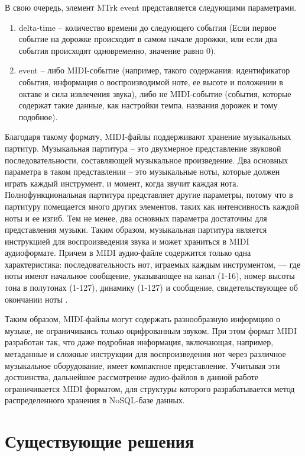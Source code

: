 В свою очередь, элемент MTrk event представляется следующими параметрами.
\begin{enumerate}
\item delta-time -- количество времени до следующего события (Если первое событие на дорожке происходит в самом начале дорожки, или если два события происходят одновременно, значение равно 0).
\item event -- либо MIDI-событие (например, такого содержания: идентификатор события, информация о воспроизводимой ноте, ее высоте и положении в октаве и сила извлечения звука), либо не MIDI-событие (события, которые содержат такие данные, как настройки темпа, названия дорожек и тому подобное).
\end{enumerate}

Благодаря такому формату, MIDI-файлы поддерживают хранение музыкальных партитур.
Музыкальная партитура \cite{P} -- это двухмерное представление звуковой последовательности, составляющей музыкальное произведение. Два основных параметра в таком представлении -- это музыкальные ноты, которые должен играть каждый инструмент, и момент, когда звучит каждая нота. Полнофункциональная партитура представляет другие параметры, потому что в партитуру помещается много других элементов, таких как интенсивность каждой ноты и ее изгиб. Тем не менее, два основных параметра достаточны для представления музыки. Таким образом, музыкальная партитура является инструкцией для воспроизведения звука и может храниться в MIDI аудиоформате. Причем в MIDI аудио-файле содержится только одна характеристика: последовательность нот, играемых каждым инструментом, — где ноты имеют начальное сообщение, указывающее на канал (1-16), номер высоты тона в полутонах (1-127), динамику (1-127) и сообщение, свидетельствующее об окончании ноты \cite{AITMAWC}.

Таким образом, MIDI-файлы могут содержать разнообразную информцию о музыке, не ограничиваясь только оцифрованным звуком. При этом формат MIDI разработан так, что даже подробная информация, включающая, например, метаданные и сложные инструкции для воспроизведения нот через различное музыкальное оборудование, имеет компактное представление. Учитывая эти достоинства, дальнейшее рассмотрение аудио-файлов в данной работе ограничивается MIDI форматом, для структуры которого разрабатывается метод распределенного хранения в NoSQL-базе данных.

\clearpage

\section{Существующие решения}


